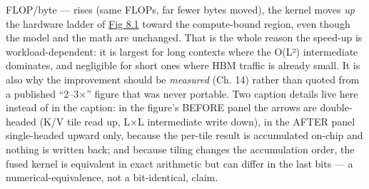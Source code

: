 FLOP/byte --- rises (same FLOPs, far fewer bytes moved), the kernel
moves \emph{up} the hardware ladder of \hyperref[fig:8.1]{Fig 8.1} toward the compute-bound
region, even though the model and the math are unchanged. That is the
whole reason the speed-up is workload-dependent: it is largest for long
contexts where the O(L²) intermediate dominates, and negligible for
short ones where HBM traffic is already small. It is also why the
improvement should be \emph{measured} (Ch. 14) rather than quoted from a
published ``2--3×'' figure that was never portable. Two caption details
live here instead of in the caption: in the figure's BEFORE panel the
arrows are double-headed (K/V tile read up, L×L intermediate write
down), in the AFTER panel single-headed upward only, because the
per-tile result is accumulated on-chip and nothing is written back; and
because tiling changes the accumulation order, the fused kernel is
equivalent in exact arithmetic but can differ in the last bits --- a
numerical-equivalence, not a bit-identical, claim.

\label{measurement}


